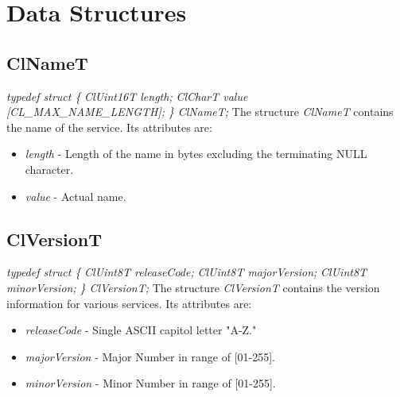 \section{Data Structures}
\subsection{ClNameT}
\textit{typedef struct \{}
\newline \textit{ClUint16T length;}
\newline \textit{ClCharT value \mbox{[}CL\_\-MAX\_\-NAME\_\-LENGTH\mbox{]};}
\newline \textit{\} ClNameT;}
\newline
\newline 
The structure \textit{ClNameT} contains the name of the service. Its attributes are:
\begin{itemize}
\item
\textit{length} - Length of the name in bytes excluding the terminating NULL character.
\item
\textit{value} - Actual name.
\end{itemize}


\subsection{ClVersionT}

\textit{typedef struct \{}
   \newline \textit{ ClUint8T  releaseCode; } 
   \newline \textit{ ClUint8T  majorVersion; }
   \newline \textit{ ClUint8T  minorVersion;} 
\newline \textit{\} ClVersionT;}
The structure \textit{ClVersionT} contains the version information for various services. Its attributes are:
\begin{itemize}
\item
\textit{releaseCode} - Single ASCII capitol letter "A-Z." 
\item
\textit{majorVersion} - Major Number in range of [01-255].
\item
\textit{minorVersion} - Minor Number in range of [01-255].
\end{itemize}


